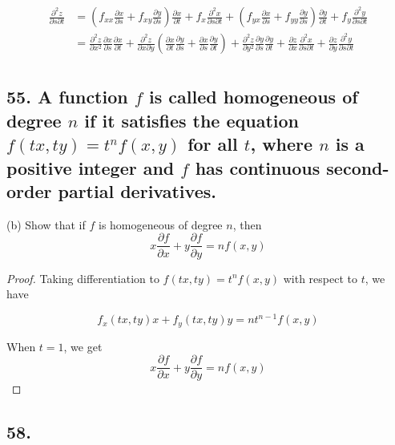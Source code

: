 \documentclass{article}
\begin{document}
\begin{enumerate}[(a)]
        $$\begin{aligned}
            \frac{\partial^2 z}{\partial s \partial t} &= (f_{xx}\frac{\partial x}{\partial s} + f_{xy}\frac{\partial y}{\partial s})\frac{\partial x}{\partial t} + f_x \frac{\partial^2 x}{\partial s \partial t} + (f_{yx}\frac{\partial x}{\partial s} + f_{yy}\frac{\partial y}{\partial s})\frac{\partial y}{\partial t} + f_y \frac{\partial^2 y}{\partial s \partial t} \\
            &= \frac{\partial^2 z}{\partial x^2}\frac{\partial x}{\partial s}\frac{\partial x}{\partial t} + \frac{\partial^2 z}{\partial x \partial y}(\frac{\partial x}{\partial t} \frac{\partial y}{\partial s} + \frac{\partial x}{\partial s} \frac{\partial y}{\partial t}) + \frac{\partial^2 z}{\partial y^2}\frac{\partial y}{\partial s}\frac{\partial y}{\partial t} + \frac{\partial z}{\partial x} \frac{\partial^2 x}{\partial s \partial t} + \frac{\partial z}{\partial y}\frac{\partial^2 y}{\partial s \partial t} \\
        \end{aligned}$$
    \end{enumerate}

    \subsection*{55. A function $f$ is called \textbf{homogeneous of degree $n$} if it satisfies the equation $f(tx, ty) = t^n f(x, y)$ for all $t$, where $n$ is a positive integer and $f$ has continuous second-order partial derivatives.}

    (b) Show that if $f$ is homogeneous of degree $n$, then $$x \frac{\partial f}{\partial x} + y \frac{\partial f}{\partial y} = n f(x, y)$$

    \begin{proof}
        Taking differentiation to $f(tx, ty) = t^nf(x, y)$ with respect to $t$, we have

        $$f_x(tx, ty) x + f_y(tx, ty) y = nt^{n-1}f(x, y)$$

        When $t = 1$, we get $$x \frac{\partial f}{\partial x} + y \frac{\partial f}{\partial y} = n f(x, y)$$
    \end{proof}

    \subsection*{58. }
\end{document}
